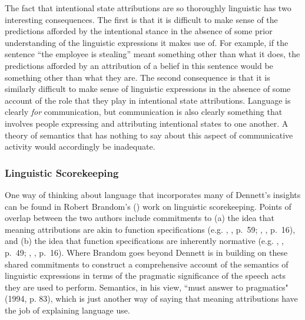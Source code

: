 The fact that intentional state attributions are so thoroughly linguistic has two interesting consequences. The first is that it is difficult to make sense of the predictions afforded by the intentional stance in the absence of some prior understanding of the linguistic expressions it makes use of. For example, if the sentence ``the employee is stealing'' meant something other than what it does, the predictions afforded by an attribution of a belief in this sentence would be something other than what they are. The second consequence is that it is similarly difficult to make sense of linguistic expressions in the absence of some account of the role that they play in intentional state attributions. Language is clearly \textit{for} communication, but communication is also clearly something that involves people expressing and attributing intentional states to one another. A theory of semantics that has nothing to say about this aspect of communicative activity would accordingly be inadequate. 

\subsubsection{Linguistic Scorekeeping}

One way of thinking about language that incorporates many of Dennett's insights can be found in Robert Brandom's (\citeyear{Brandom:1994}) work on linguistic scorekeeping. Points of overlap between the two authors include commitments to (a) the idea that meaning attributions are akin to function specifications (e.g. \citeauthor{Dennett:1987}, \citeyear{Dennett:1987}, p.~59; \citeauthor{Brandom:1994}, \citeyear{Brandom:1994}, p.~16), and (b) the idea that function specifications are inherently normative (e.g. \citeauthor{Dennett:1987}, \citeyear{Dennett:1987}, p.~49; \citeauthor{Brandom:1994}, \citeyear{Brandom:1994}, p.~16). Where Brandom goes beyond Dennett is in building on these shared commitments to construct a comprehensive account of the semantics of linguistic expressions in terms of the pragmatic significance of the speech acts they are used to perform. Semantics, in his view, ``must answer to pragmatics" (1994, p. 83), which is just another way of saying that meaning attributions have the job of explaining language use. 

